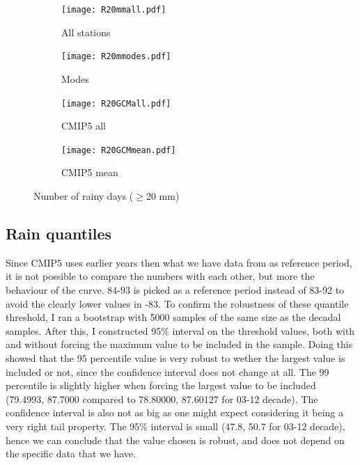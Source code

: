 \documentclass{article}
\begin{document}
\begin{figure}[H]
	\centering
	\begin{subfigure}{0.5\textwidth}
		\centering
		\texttt{[image: R20mmall.pdf]}
		\caption{All stations}
	\end{subfigure}%
	\begin{subfigure}{0.5\textwidth}
		\centering
		\texttt{[image: R20mmodes.pdf]}
		\caption{Modes}
	\end{subfigure}
	\begin{subfigure}{0.5\textwidth}
		\centering
		\texttt{[image: R20GCMall.pdf]}
		\caption{CMIP5 all}
	\end{subfigure}%
	\begin{subfigure}{0.5\textwidth}
		\centering
		\texttt{[image: R20GCMmean.pdf]}
		\caption{CMIP5 mean}
	\end{subfigure}
	\caption{Number of rainy days ($\geq$20 mm)}
	\label{R20mm}
\end{figure}

\subsection{Rain quantiles}
Since CMIP5 uses earlier years then what we have data from as reference period, it is not possible to compare the numbers with each other, but more the behaviour of the curve. 84-93 is picked as a reference period instead of 83-92 to avoid the clearly lower values in -83. To confirm the robustness of these quantile threshold, I ran a bootstrap with 5000 samples of the same size as the decadal samples. After this, I constructed 95\% interval on the threshold values, both with and without forcing the maximum value to be included in the sample. Doing this showed that the 95 percentile value is very robust to wether the largest value is included or not, since the confidence interval does not change at all. The 99 percentile is slightly higher when forcing the largest value to be included (79.4993, 87.7000 compared to 78.80000, 87.60127 for 03-12 decade). The confidence interval is also not as big as one might expect considering it being a very right tail property. The 95\% interval is small (47.8,  50.7  for 03-12 decade), hence we can conclude that the value chosen is robust, and does not depend on the specific data that we have.
\end{document}
